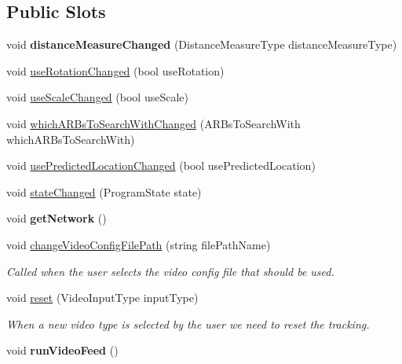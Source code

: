 \subsection*{Public Slots}
\begin{DoxyCompactItemize}
\item 
\hypertarget{class_tracking_and_detection_a8ca5a5cadb863fb27398d30726f41deb}{}void {\bfseries distance\+Measure\+Changed} (Distance\+Measure\+Type distance\+Measure\+Type)\label{class_tracking_and_detection_a8ca5a5cadb863fb27398d30726f41deb}

\item 
void \hyperlink{class_tracking_and_detection_a8ebab1c0f4615155db5fc87f477b5133}{use\+Rotation\+Changed} (bool use\+Rotation)
\item 
void \hyperlink{class_tracking_and_detection_a0288d1f356c9eaa5bf6074b6eef5b8d8}{use\+Scale\+Changed} (bool use\+Scale)
\item 
void \hyperlink{class_tracking_and_detection_a8c9a4536964366076a76ba0bb52c5c5f}{which\+A\+R\+Bs\+To\+Search\+With\+Changed} (A\+R\+Bs\+To\+Search\+With which\+A\+R\+Bs\+To\+Search\+With)
\item 
void \hyperlink{class_tracking_and_detection_a56ae5d619bb8f38f58c9c2d58a1c9590}{use\+Predicted\+Location\+Changed} (bool use\+Predicted\+Location)
\item 
void \hyperlink{class_tracking_and_detection_ac115a3770df344a0b5dfbd626094a85d}{state\+Changed} (Program\+State state)
\item 
\hypertarget{class_tracking_and_detection_a0fb0b246ec71cb4efdf55114d54f733d}{}void {\bfseries get\+Network} ()\label{class_tracking_and_detection_a0fb0b246ec71cb4efdf55114d54f733d}

\item 
void \hyperlink{class_tracking_and_detection_aad697a8cd333e516098e44c5bab33bab}{change\+Video\+Config\+File\+Path} (string file\+Path\+Name)
\begin{DoxyCompactList}\small\item\em Called when the user selects the video config file that should be used. \end{DoxyCompactList}\item 
void \hyperlink{class_tracking_and_detection_a88b3a6b164c4e3038090d2e8b9069914}{reset} (Video\+Input\+Type input\+Type)
\begin{DoxyCompactList}\small\item\em When a new video type is selected by the user we need to reset the tracking. \end{DoxyCompactList}\item 
\hypertarget{class_tracking_and_detection_a3d909c374ab512204cc78e85168f9ecc}{}void {\bfseries run\+Video\+Feed} ()\label{class_tracking_and_detection_a3d909c374ab512204cc78e85168f9ecc}


\end{DoxyCompactItemize}
